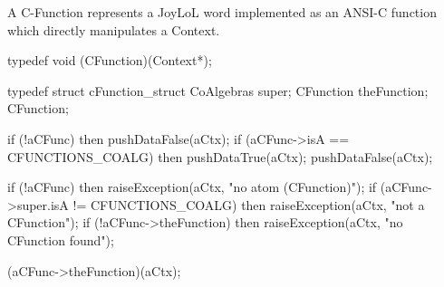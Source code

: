 
\startJoyLoLCoAlg[title=C-Functions][cFunctions]

\srcCopyrightCCBYSA[title={JoyLoL}, url=https://perceptisys.co.uk, 
src=https://github.com/stephengaito/joylol, author={Perceptisys Ltd 
(Stephen Gaito)}, year=2017] 

\targetCopyrightMIT[author={PerceptiSys Ltd (Stephen Gaito)}, year=2017]

\startsection[title=Goals]

A C-Function represents a JoyLoL word implemented as an ANSI-C function 
which directly manipulates a Context. 

\dependsOn[coAlgebras]
\dependsOn[context]
\dependsOn[boolean]

\startJoyLoLCHeader

typedef void (CFunction)(Context*);

typedef struct cFunction_struct {
  CoAlgebras super;
  CFunction  theFunction;
} CFunction;

\stopJoyLoLCHeader

\startJoyLoLWord[isCFunction]

\preProcessStack[aCFunc][]
\postDataStack[isBoolean]

\startJoyLoLCCode

if (!aCFunc) then
  pushDataFalse(aCtx);
if (aCFunc->isA == CFUNCTIONS_COALG) then
  pushDataTrue(aCtx);
pushDataFalse(aCtx);

\stopJoyLoLCCode

\stopJoyLoLWord

\startJoyLoLWord[executeCFunc]

\preProcessStack[aCFunc][]

\startJoyLoLCCode

if (!aCFunc) then
  raiseException(aCtx, "no atom (CFunction)");
if (aCFunc->super.isA != CFUNCTIONS_COALG) then
  raiseException(aCtx, "not a CFunction");
if (!aCFunc->theFunction) then
  raiseException(aCtx, "no CFunction found");

(aCFunc->theFunction)(aCtx);

\stopJoyLoLCCode

\stopJoyLoLWord

\stopsection

\stopJoyLoLCoAlg
